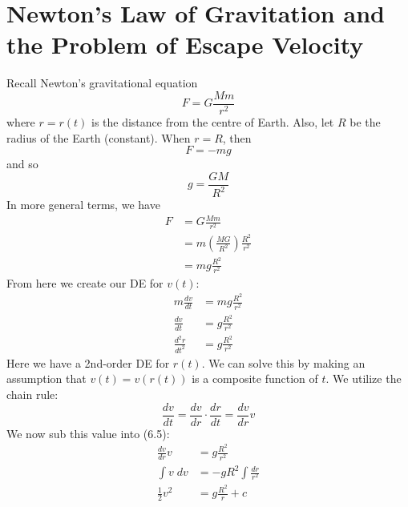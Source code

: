 \documentclass{report}
\begin{document}
\section{Newton's Law of Gravitation and the Problem of Escape Velocity}
Recall Newton's gravitational equation
$$F = G \frac{Mm}{r^2}$$
where $r = r(t)$ is the distance from the centre of Earth. Also, let $R$ be the radius of the Earth (constant). When $r=R$, then
$$F = -mg$$
and so
$$g = \frac{GM}{R^2}$$
In more general terms, we have
\begin{align}
    F &= G\frac{Mm}{r^2} \\
    &= m\left(\frac{MG}{R^2}\right)\frac{R^2}{r^2} \\
    &= mg\frac{R^2}{r^2}
\end{align}
From here we create our DE for $v(t)$:
\begin{align}
    m\frac{dv}{dt} &= mg\frac{R^2}{r^2} \\
    \frac{dv}{dt} &= g\frac{R^2}{r^2} \\
    \frac{d^2r}{dt^2} &= g\frac{R^2}{r^2}
\end{align}
Here we have a 2nd-order DE for $r(t)$. We can solve this by making an assumption that $v(t) = v(r(t))$ is a composite function of $t$. We utilize the chain rule:
$$\frac{dv}{dt} = \frac{dv}{dr} \cdot \frac{dr}{dt} = \frac{dv}{dr}v$$
We now sub this value into (6.5):
\begin{align}
    \frac{dv}{dr}v &= g\frac{R^2}{r^2} \\
    \int v \; dv &= -gR^2\int \frac{dr}{r^2} \\
    \frac{1}{2}v^2 &= g\frac{R^2}{r} + c
\end{align}
\end{document}
